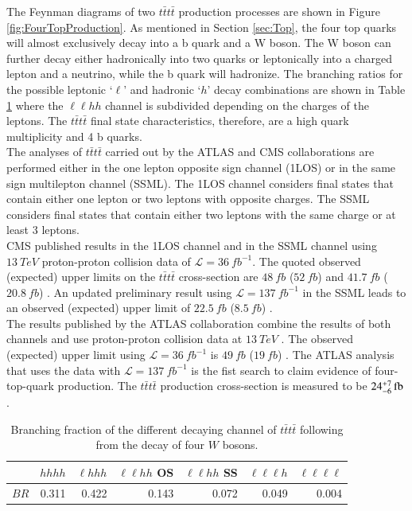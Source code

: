 The Feynman diagrams of two $t\bar{t}t\bar{t}$ production processes are shown in Figure \ref{fig:FourTopProduction}. As mentioned in Section \ref{sec:Top}, the four top quarks will almost exclusively decay into a b quark and a W boson. The W boson can further decay either hadronically into two quarks or leptonically into a charged lepton and a neutrino, while the b quark will hadronize. The branching ratios for the possible leptonic `$\ell$' and hadronic `$h$' decay combinations are shown in Table \ref{tab:fourtopdecays} where the $\ell \ell hh$ channel is subdivided depending on the charges of the leptons. The $t\bar{t}t\bar{t}$ final state characteristics, therefore, are a high quark multiplicity and 4 b quarks. \\
The analyses of $t\bar{t}t\bar{t}$ carried out by the ATLAS and CMS collaborations are performed either in the one lepton opposite sign channel (1LOS) or in the same sign multilepton channel (SSML). The 1LOS channel considers final states that contain either one lepton or two leptons with opposite charges. The SSML considers final states that contain either two leptons with the same charge or at least 3 leptons. \\
CMS published results in the 1LOS channel and in the SSML channel using $\SI{13}{TeV}$ proton-proton collision data of $\mathcal{L} = \SI{36}{fb}^{-1}$. The quoted observed (expected) upper limits on the $t\bar{t}t\bar{t}$ cross-section are $\SI{48}{fb}$ ($\SI{52}{fb}$) \cite{cross1} and $\SI{41.7}{fb}$ ($\SI{20.8}{fb}$) \cite{cross2} . An updated preliminary result using $\mathcal{L} = \SI{137}{fb}^{-1}$ in the SSML leads to an observed (expected) upper limit of $\SI{22.5}{fb}$ ($\SI{8.5}{fb}$) \cite{cross3}. \\
The results published by the ATLAS collaboration combine the results of both channels and use proton-proton collision data at $\SI{13}{TeV}$ . The observed (expected) upper limit using $\mathcal{L} = \SI{36}{fb}^{-1}$ is $\SI{49}{fb}$ ($\SI{19}{fb}$) \cite{cross4}. The ATLAS analysis that uses the data with $\mathcal{L} = \SI{137}{fb}^{-1}$ is the fist search to claim evidence of four-top-quark production. The $t\bar{t}t\bar{t}$ production cross-section is measured to be $\SI[parse-numbers=false]{24^{+7}_{-6}}{fb}$ \cite{cross5}.

\begin{table}[H]
\centering
\begin{tabular}{|r|r|r|r|r|r|r|}
\toprule
& $hhhh$ & $\ell hhh$ & $\ell \ell hh$ OS & $\ell \ell hh$ SS & $\ell \ell \ell h$ & $\ell \ell \ell \ell$ \\
\midrule
$BR$ & 0.311 & 0.422 & 0.143 & 0.072 & 0.049 & 0.004 \\
\bottomrule
\end{tabular}
\caption{Branching fraction of the different decaying channel of $t\bar{t}t\bar{t}$ following from the decay of four $W$ bosons.}
\label{tab:fourtopdecays}
\end{table}


